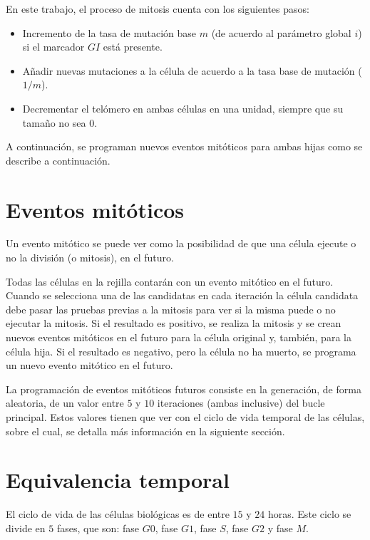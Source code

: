 En este trabajo, el proceso de mitosis cuenta con los siguientes pasos:

\begin{itemize}
    \item Incremento de la tasa de mutación base $m$ (de acuerdo al parámetro global $i$) si el marcador
    $GI$ está presente.
    \item Añadir nuevas mutaciones a la célula de acuerdo a la tasa base de mutación ($1/m$).
    \item Decrementar el telómero en ambas células en una unidad, siempre que su tamaño no sea 0.
\end{itemize}

A continuación, se programan nuevos eventos mitóticos para ambas hijas como se describe a continuación.

\section{Eventos mitóticos}

Un evento mitótico se puede ver como la posibilidad de que una célula ejecute o no la división (o mitosis),
en el futuro.

Todas las células en la rejilla contarán con un evento mitótico en el futuro. Cuando se selecciona una
de las candidatas en cada iteración la célula candidata debe pasar las pruebas previas a la mitosis para ver
si la misma puede o no ejecutar la mitosis. Si el resultado es positivo, se realiza la mitosis y se crean
nuevos eventos mitóticos en el futuro para la célula original y, también, para la célula hija.
Si el resultado es negativo, pero la célula no ha muerto, se programa un nuevo evento mitótico en el futuro.

La programación de eventos mitóticos futuros consiste en la generación, de forma aleatoria, de un valor
entre $5$ y $10$ iteraciones (ambas inclusive) del bucle principal. Estos valores tienen que ver con el ciclo de vida
temporal de las células, sobre el cual, se detalla más información en la siguiente sección.

\section{Equivalencia temporal}

El ciclo de vida de las células biológicas es de entre $15$ y $24$ horas. Este ciclo se divide en $5$ fases, que son:
fase $G0$, fase $G1$, fase $S$, fase $G2$ y fase $M$.

